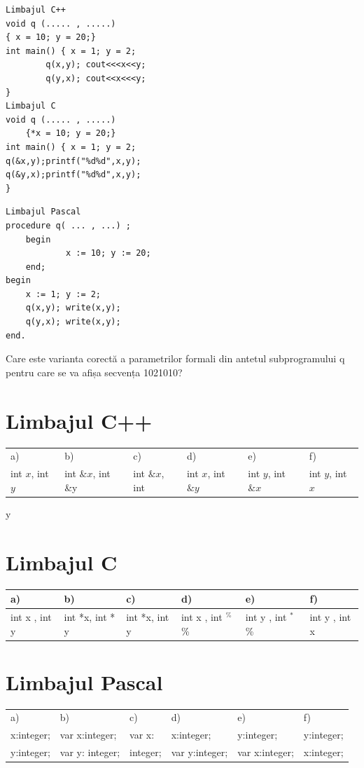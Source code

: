 \documentclass[10pt]{article}
\begin{document}
\begin{verbatim}
Limbajul C++
void q (..... , .....)
{ x = 10; y = 20;}
int main() { x = 1; y = 2;
        q(x,y); cout<<<x<<y;
        q(y,x); cout<<x<<<y;
}
Limbajul C
void q (..... , .....)
    {*x = 10; y = 20;}
int main() { x = 1; y = 2;
q(&x,y);printf("%d%d",x,y);
q(&y,x);printf("%d%d",x,y);
}
\end{verbatim}

\begin{verbatim}
Limbajul Pascal
procedure q( ... , ...) ;
    begin
            x := 10; y := 20;
    end;
begin
    x := 1; y := 2;
    q(x,y); write(x,y);
    q(y,x); write(x,y);
end.
\end{verbatim}

Care este varianta corectă a parametrilor formali din antetul subprogramului q pentru care se va afișa secvența 1021010?

\section*{Limbajul C++}
\begin{center}
\begin{tabular}{llllll}
a) & b) & c) & d) & e) & f) \\
int $x$, int $y$ & int $\& x$, int \&y & int $\& x$, int & int $x$, int $\& y$ & int $y$, int $\& x$ & int $y$, int $x$ \\
\end{tabular}
\end{center} y

\section*{Limbajul C}
\begin{center}
\begin{tabular}{|l|l|l|l|l|l|}
\hline
a) & b) & c) & d) & e) & f) \\
\hline
int x , int y & int *x, int * y & int *x, int y & int x , int ${ }^{\text {\% }}$ \% & int y , int ${ }^{\text {* }}$ \% & int y , int x \\
\hline
\end{tabular}
\end{center}

\section*{Limbajul Pascal}
\begin{center}
\begin{tabular}{llllll}
a) & b) & c) & d) & e) & f) \\
x:integer; & var x:integer; & var x: & x:integer; & y:integer; & y:integer; \\
y:integer; & var y: integer; & integer; & var y:integer; & var x:integer; & x:integer; \\
\end{tabular}
\end{center}
\end{document}
